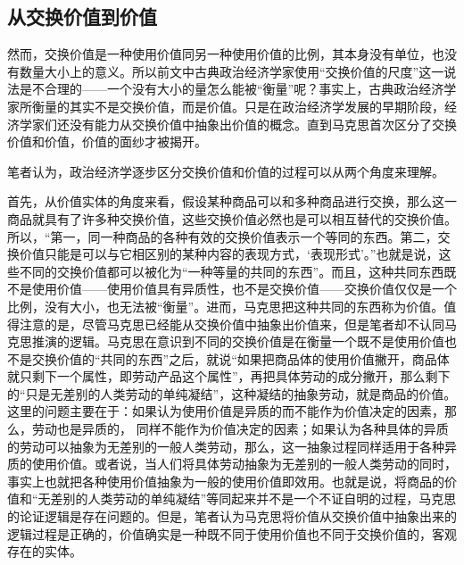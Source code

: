 \subsection{从交换价值到价值}

然而，交换价值是一种使用价值同另一种使用价值的比例，其本身没有单位，也没有数量大小上的意义。所以前文中古典政治经济学家使用“交换价值的尺度”这一说法是不合理的——一个没有大小的量怎么能被“衡量”呢？事实上，古典政治经济学家所衡量的其实不是交换价值，而是价值。只是在政治经济学发展的早期阶段，经济学家们还没有能力从交换价值中抽象出价值的概念。直到马克思首次区分了交换价值和价值，价值的面纱才被揭开\cite[86-87]{ChenDaiSunCongGuDianJingJiXuePaiDaoMaKeSiRuoGanZhuYaoXueShuoFaZhanLueLun2014}。

笔者认为，政治经济学逐步区分交换价值和价值的过程可以从两个角度来理解。

首先，从价值实体的角度来看，假设某种商品可以和多种商品进行交换，那么这一商品就具有了许多种交换价值，这些交换价值必然也是可以相互替代的交换价值。所以，“第一，同一种商品的各种有效的交换价值表示一个等同的东西。第二，交换价值只能是可以与它相区别的某种内容的表现方式，‘表现形式’。”\cite[49]{ZhongGongZhongYangMaKeSiEnGeSiLieNingSiDaLinZhuZuoBianYiJuMaKeSiEnGeSiWenJiDi5Juan2009}也就是说，这些不同的交换价值都可以被化为“一种等量的共同的东西”\cite[49]{ZhongGongZhongYangMaKeSiEnGeSiLieNingSiDaLinZhuZuoBianYiJuMaKeSiEnGeSiWenJiDi5Juan2009}。而且，这种共同东西既不是使用价值——使用价值具有异质性，也不是交换价值——交换价值仅仅是一个比例，没有大小，也无法被“衡量”。进而，马克思把这种共同的东西称为价值\cite[50]{ZhongGongZhongYangMaKeSiEnGeSiLieNingSiDaLinZhuZuoBianYiJuMaKeSiEnGeSiWenJiDi5Juan2009}。值得注意的是，尽管马克思已经能从交换价值中抽象出价值来，但是笔者却不认同马克思推演的逻辑。马克思在意识到不同的交换价值是在衡量一个既不是使用价值也不是交换价值的“共同的东西”之后，就说“如果把商品体的使用价值撇开，商品体就只剩下一个属性，即劳动产品这个属性”\cite[50-51]{ZhongGongZhongYangMaKeSiEnGeSiLieNingSiDaLinZhuZuoBianYiJuMaKeSiEnGeSiWenJiDi5Juan2009}，再把具体劳动的成分撇开，那么剩下的“只是无差别的人类劳动的单纯凝结”，这种凝结的抽象劳动，就是商品的价值\cite[51]{ZhongGongZhongYangMaKeSiEnGeSiLieNingSiDaLinZhuZuoBianYiJuMaKeSiEnGeSiWenJiDi5Juan2009}。这里的问题主要在于：如果认为使用价值是异质的而不能作为价值决定的因素，那么，劳动也是异质的， 同样不能作为价值决定的因素；如果认为各种具体的异质的劳动可以抽象为无差别的一般人类劳动，那么，这一抽象过程同样适用于各种异质的使用价值。或者说，当人们将具体劳动抽象为无差别的一般人类劳动的同时，事实上也就把各种使用价值抽象为一般的使用价值即效用\cite[84]{CaiJiMingLunJieZhiJueDingYuJieZhiFenPeiDeTongYi2003}。也就是说，将商品的价值和“无差别的人类劳动的单纯凝结”等同起来并不是一个不证自明的过程，马克思的论证逻辑是存在问题的。但是，笔者认为马克思将价值从交换价值中抽象出来的逻辑过程是正确的，价值确实是一种既不同于使用价值也不同于交换价值的，客观存在的实体。

